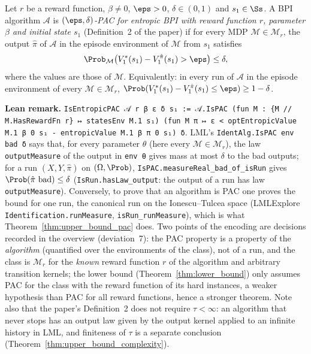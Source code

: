 \begin{definition}\label{def:entropic_pac}
\leanok
{}
Let $r$ be a reward function, $\beta \ne 0$, $\eps > 0$, $\delta \in (0, 1)$ and $s_1 \in \Ss$. A
BPI algorithm $\mathcal A$ is \emph{$(\eps, \delta)$-PAC for entropic BPI with reward function
$r$, parameter $\beta$ and initial state $s_1$} (Definition~2 of the paper) if for every MDP
$\mathcal M \in \mathcal M_r$, the output $\hat\pi$ of $\mathcal A$ in the episode environment of
$\mathcal M$ from $s_1$ satisfies
\[
  \Prob_{\mathcal M}\big( V^*_1(s_1) - V^{\hat\pi}_1(s_1) > \eps \big) \le \delta ,
\]
where the values are those of $\mathcal M$. Equivalently: in every run of $\mathcal A$ in the episode
environment of every $\mathcal M \in \mathcal M_r$, $\Prob(V^*_1(s_1) - V^{\hat\pi}_1(s_1) \le \eps) \ge 1 - \delta$.
\end{definition}

\textbf{Lean remark.} \texttt{IsEntropicPAC 𝒜 r β ε δ s₁ := 𝒜.IsPAC (fun M : \{M // M.HasRewardFn r\} ↦ statesEnv M.1 s₁) (fun M π ↦ ε < optEntropicValue M.1 β 0 s₁ - entropicValue M.1 β π 0 s₁) δ}.
LML's \texttt{IdentAlg.IsPAC env bad δ} says that, for every parameter $\theta$ (here every
$\mathcal M \in \mathcal M_r$), the law \texttt{outputMeasure} of the output in \texttt{env θ} gives
mass at most $\delta$ to the bad outputs; for a run $(X, Y, \hat\pi)$ on $(\Omega, \Prob)$,
\texttt{IsPAC.measureReal\_bad\_of\_isRun} gives $\Prob(\hat\pi \text{ bad}) \le \delta$
(\texttt{IsRun.hasLaw\_output}: the output of a run has law \texttt{outputMeasure}). Conversely,
to prove that an algorithm is PAC one proves the bound for one run, the canonical run on the
Ionescu--Tulcea space (LMLExplore \texttt{Identification.runMeasure}, \texttt{isRun\_runMeasure}), which
is what Theorem~\ref{thm:upper_bound_pac} does. Two points of the encoding are decisions
recorded in the overview (deviation~7): the PAC property is a property of the \emph{algorithm}
(quantified over the environments of the class), not of a run, and the class is
$\mathcal M_r$ for the \emph{known} reward function $r$ of the algorithm and arbitrary
transition kernels; the lower bound (Theorem~\ref{thm:lower_bound}) only assumes PAC for the
class with the reward function of its hard instances, a weaker hypothesis than PAC for all
reward functions, hence a stronger theorem. Note also that the paper's Definition~2 does not
require $\tau < \infty$: an algorithm that never stops has an output law given by the output
kernel applied to an infinite history in LML, and finiteness of $\tau$ is a separate
conclusion (Theorem~\ref{thm:upper_bound_complexity}).
